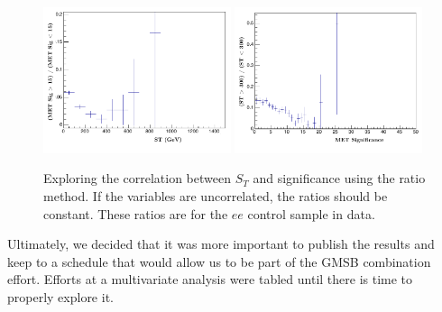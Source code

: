 \begin{figure}[h]
\begin{center}
\includegraphics[width=0.49\textwidth]{Figures/Appendix/kappa1.pdf}
\includegraphics[width=0.49\textwidth]{Figures/Appendix/kappa2.pdf}
\end{center}
\caption{Exploring the correlation between $S_T$ and \ETmiss significance using
the ratio method. If the variables are uncorrelated, the ratios should be constant. These
ratios are for the $ee$ control sample in data.}
\label{fig:kappa}
\end{figure}

Ultimately, we decided that it was more important to publish the results and keep to 
a schedule that would allow us to be part of the GMSB combination effort. Efforts at a 
multivariate analysis were tabled until there is time to properly explore it.


